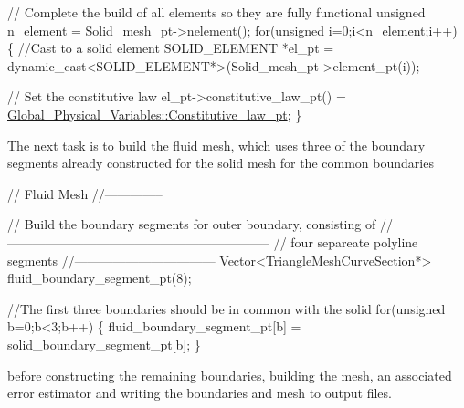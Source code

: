 \begin{DoxyCodeInclude}

 \textcolor{comment}{// Complete the build of all elements so they are fully functional}
 \textcolor{keywordtype}{unsigned} n\_element = Solid\_mesh\_pt->nelement();
 \textcolor{keywordflow}{for}(\textcolor{keywordtype}{unsigned} i=0;i<n\_element;i++)
  \{
   \textcolor{comment}{//Cast to a solid element}
   SOLID\_ELEMENT *el\_pt = 
    \textcolor{keyword}{dynamic\_cast<}SOLID\_ELEMENT*\textcolor{keyword}{>}(Solid\_mesh\_pt->element\_pt(i));
   
   \textcolor{comment}{// Set the constitutive law}
   el\_pt->constitutive\_law\_pt() =
    \hyperlink{namespaceGlobal__Physical__Variables_a2a37fb040c832ee7a086bb13bb02a100}{Global\_Physical\_Variables::Constitutive\_law\_pt};
  \}

\end{DoxyCodeInclude}


The next task is to build the fluid mesh, which uses three of the boundary segments already constructed for the solid mesh for the common boundaries


\begin{DoxyCodeInclude}


 \textcolor{comment}{// Fluid Mesh}
 \textcolor{comment}{//--------------}

 \textcolor{comment}{// Build the boundary segments for outer boundary, consisting of}
 \textcolor{comment}{//--------------------------------------------------------------}
 \textcolor{comment}{// four separeate polyline segments}
 \textcolor{comment}{//---------------------------------}
 Vector<TriangleMeshCurveSection*> fluid\_boundary\_segment\_pt(8);
 
 \textcolor{comment}{//The first three boundaries should be in common with the solid}
 \textcolor{keywordflow}{for}(\textcolor{keywordtype}{unsigned} b=0;b<3;b++)
  \{
   fluid\_boundary\_segment\_pt[b] = solid\_boundary\_segment\_pt[b];
  \}

\end{DoxyCodeInclude}


before constructing the remaining boundaries, building the mesh, an associated error estimator and writing the boundaries and mesh to output files.


